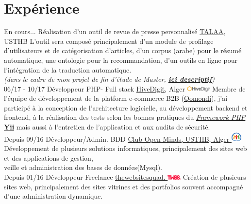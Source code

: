 \documentclass[]{friggeri-cv}
\begin{document}
\vspace{1cm}
\section{Expérience}
\begin{entrylist}
  \entry
    {En cours...}
    {Réalisation d'un outil de revue de presse personnalisé}
    {\href{http://lria.usthb.dz/TALAATeam/People.php}{TALAA}, USTHB }
    {L'outil sera composé principalement d'un module de profilage d'utilisateurs et de catégorisation d'articles, d'un corpus (arabe) pour le résumé automatique, une ontologie pour la recommandation, d'un outils en ligne pour l’intégration de la traduction automatique.\\\emph{(dans le cadre de mon projet de fin d'étude de Master, \href{http://www.abafann.com/said_pfe.pdf}{\textbf{ici descriptif}})}\\}
  \entry
    {06/17 - 10/17}
    {Développeur PHP- Full stack}
    {\href{http://www.hivedigit.com/}{HiveDigit}, Alger \includegraphics[width=35pt]{images/hivedigit.png} }
    {Membre de l'équipe de développement de la platform e-commerce B2B (\href{http://www.demo.b2b-dz.com/}{Qomondi}), j'ai participé à la conception de l'architecture logicielle, au développement backend et frontend, à la réalisation des tests selon les bonnes pratiques du \href{https://fr.wikipedia.org/wiki/Liste_de_frameworks_PHP}{\emph{Framework PHP}} \href{http://www.yiiframework.com/}{\textbf{Yii}} mais aussi à l'entretien de l'application et aux audits de sécurité.\\}
  \entry
    {Depuis 09/16}
    {Développeur/Admin. BDD}
    {\href{http://www.openmindsclub.net/}{Club Open Minds, USTHB, Alger \includegraphics[width=15pt]{images/favicon.png}}}
    {Développement de plusieurs solutions informatiques, principalement des sites web et des applications de gestion,\\veille et administration des bases de données(Mysql).\\}
  \entry
    {Depuis 01/16}
    {Développeur Freelance}
    {\href{http://www.twss.digital/}{thewebsitesquad. \includegraphics[width=20pt]{images/twss.png}}}
    {Création de plusieurs sites web, principalement des sites vitrines et des portfolios souvent accompagné d'une administration dynamique.\\
}
\end{entrylist}
\end{document}
